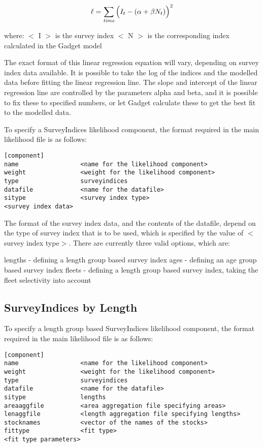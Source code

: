 \documentclass[10pt,twoside]{book}
\begin{document}
\begin{equation}\label{eq:surveyindex}
\ell = \sum_{\it time}\Big(I_{t} - (\alpha + \beta N_{t})\Big)^2
\end{equation}

where:\newline
$<$ I $>$ is the survey index\newline
$<$ N $>$ is the corresponding index calculated in the Gadget model

\bigskip
The exact format of this linear regression equation will vary, depending on survey index data available.  It is possible to take the log of the indices and the modelled data before fitting the linear regression line.  The slope and intercept of the linear regression line are controlled by the parameters alpha and beta, and it is possible to fix these to specified numbers, or let Gadget calculate these to get the best fit to the modelled data.

\bigskip
To specify a SurveyIndices likelihood component, the format required in the main likelihood file is as follows:

{\small\begin{verbatim}
[component]
name                 <name for the likelihood component>
weight               <weight for the likelihood component>
type                 surveyindices
datafile             <name for the datafile>
sitype               <survey index type>
<survey index data>
\end{verbatim}}

The format of the survey index data, and the contents of the datafile, depend on the type of survey index that is to be used, which is specified by the value of $<$survey index type$>$.  There are currently three valid options, which are:

\bigskip
lengths - defining a length group based survey index\newline
ages - defining an age group based survey index\newline
fleets - defining a length group based survey index, taking the fleet selectivity into account

\subsection{SurveyIndices by Length}\label{subsec:sibylength}
To specify a length group based SurveyIndices likelihood component, the format required in the main likelihood file is as follows:

{\small\begin{verbatim}
[component]
name                 <name for the likelihood component>
weight               <weight for the likelihood component>
type                 surveyindices
datafile             <name for the datafile>
sitype               lengths
areaaggfile          <area aggregation file specifying areas>
lenaggfile           <length aggregation file specifying lengths>
stocknames           <vector of the names of the stocks>
fittype              <fit type>
<fit type parameters>
\end{verbatim}}
\end{document}
